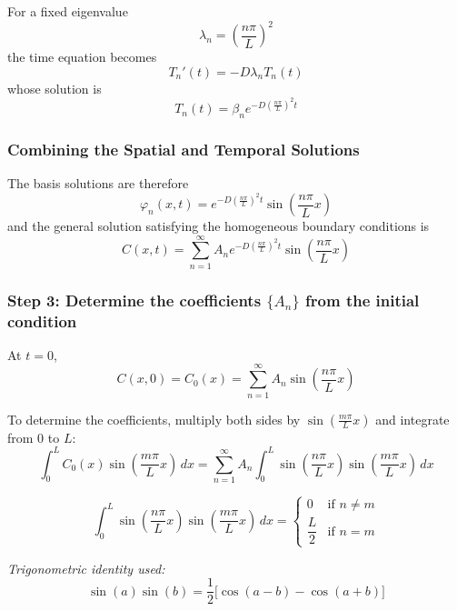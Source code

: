 For a fixed eigenvalue
\begin{equation}
    \lambda_n=\left(\frac{n\pi}{L}\right)^2
\end{equation}
the time equation becomes
\begin{equation*}
    T_n'(t) = -D\lambda_n T_n(t)
\end{equation*}
whose solution is
\begin{equation}
    T_n(t)=\beta_n e^{-D\left(\frac{n\pi}{L}\right)^2 t}
\end{equation}

\subsubsection{Combining the Spatial and Temporal Solutions}

The basis solutions are therefore
\begin{equation}
    \varphi_n(x,t)=e^{-D\left(\frac{n\pi}{L}\right)^2 t}\sin\left(\frac{n\pi}{L}x\right)
\end{equation}
and the general solution satisfying the homogeneous boundary conditions is
\begin{equation}
    C(x,t)=\sum_{n=1}^{\infty} A_n e^{-D\left(\frac{n\pi}{L}\right)^2 t}\sin\left(\frac{n\pi}{L}x\right)
\end{equation}

\subsubsection{Step 3: Determine the coefficients $\{A_n\}$ from the initial condition}

At $t=0$,
\begin{equation}
    C(x,0)=C_0(x)=\sum_{n=1}^{\infty} A_n \sin\left(\frac{n\pi}{L}x\right)
\end{equation}

To determine the coefficients, multiply both sides by $\sin\left(\frac{m\pi}{L}x\right)$ and integrate from $0$ to $L$:
\begin{equation*}
    \int_0^L C_0(x)\sin\left(\frac{m\pi}{L}x\right)\,dx
    =
    \sum_{n=1}^{\infty}
    A_n
    \int_0^L
    \sin\left(\frac{n\pi}{L}x\right)
    \sin\left(\frac{m\pi}{L}x\right)\,dx
\end{equation*}

\begin{notebox}
\begin{equation*}
    \int_0^L
    \sin\left(\frac{n\pi}{L}x\right)
    \sin\left(\frac{m\pi}{L}x\right)\,dx
    =
    \begin{cases}
        0 & \text{if } n\neq m \\
        \dfrac{L}{2} & \text{if } n=m
    \end{cases}
\end{equation*}

\textit{Trigonometric identity used:}
\begin{equation*}
    \sin(a)\sin(b)=\frac{1}{2}\big[\cos(a-b)-\cos(a+b)\big]
\end{equation*}
\end{notebox}

